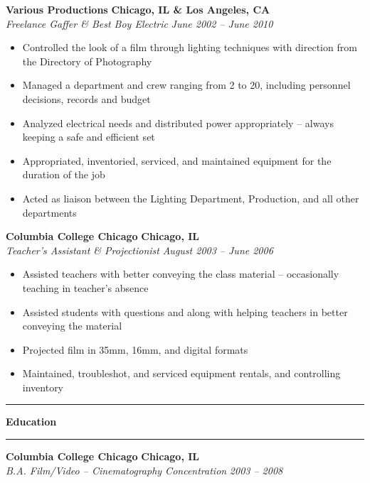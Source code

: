 \documentclass[10pt,letterpaper]{article}			%
\newcommand{
    \JobHeader}[4]{
	\textbf{#1}
	\hfill
	\textbf{#2}
	\\
	\emph{#3}
	\hfill
	\emph{#4}
	}
\newcommand{
    \sectionHeader}[1]{
    \hrule
    \vspace{0.2em}
    {\large \textbf {#1}}
    \vspace{0.2em}
    \hrule
    \vspace{0.2em}
    }
\begin{document}
	\JobHeader{Various Productions}{Chicago, IL \& Los Angeles, CA}{Freelance Gaffer \& Best Boy Electric}{June 2002 -- June 2010}
		\begin{itemize}
		    \item Controlled the look of a film through lighting techniques with direction from the Directory of Photography
		    \item Managed a department and crew ranging from 2 to 20, including personnel decisions, records and budget
		    \item Analyzed electrical needs and distributed power appropriately -- always keeping a safe and efficient set
		    \item Appropriated, inventoried, serviced, and maintained equipment for the duration of the job
		    \item Acted as liaison between the Lighting Department, Production, and all other departments
		\end{itemize}
	\JobHeader{Columbia College Chicago}{Chicago, IL}{Teacher's Assistant \& Projectionist}{August 2003 -- June 2006}
		\begin{itemize}
            \item Assisted teachers with better conveying the class material -- occasionally teaching in teacher's absence
		    \item Assisted students with questions and along with helping teachers in better conveying the material
		    \item Projected film in 35mm, 16mm, and digital formats 
		    \item Maintained, troubleshot, and serviced equipment rentals, and controlling inventory
		\end{itemize}

\sectionHeader{Education}
	\JobHeader{Columbia College Chicago}{Chicago, IL}{B.A. Film/Video -- Cinematography Concentration}{2003 -- 2008}

\begin{comment}
\end{minipage}
\fbox{
\begin{minipage}[t]{.39\textwidth}
    \captionof{table}{
        \large{\textbf{Personal \& Public Projects}}
        \hrule
    }
    \begin{tabular}{>{\bfseries}r|p{.49\textwidth}}
        battleship & Multiplayer game written in Python -- eventually to be rewritten as a webapp \\
        homelessgaffer.com & Simple CMS written with Flask \\
        excercises & More words that will probably wrap\\
    \end{tabular}
\end{minipage}
}
\end{comment}
\end{document}
